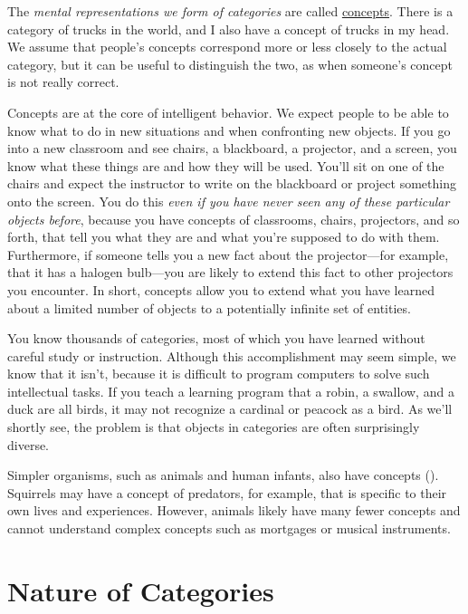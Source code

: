 \documentclass[
]{krantz}
\begin{document}
The \emph{mental representations we form of categories} are called \href{concept}{concepts}. There is a category of trucks in the world, and I also have a concept of trucks in my head. We assume that people's concepts correspond more or less closely to the actual category, but it can be useful to distinguish the two, as when someone's concept is not really correct.

Concepts are at the core of intelligent behavior. We expect people to be able to know what to do in new situations and when confronting new objects. If you go into a new classroom and see chairs, a blackboard, a projector, and a screen, you know what these things are and how they will be used. You'll sit on one of the chairs and expect the instructor to write on the blackboard or project something onto the screen. You do this \emph{even if you have never seen any of these particular objects before}, because you have concepts of classrooms, chairs, projectors, and so forth, that tell you what they are and what you're supposed to do with them. Furthermore, if someone tells you a new fact about the projector---for example, that it has a halogen bulb---you are likely to extend this fact to other projectors you encounter. In short, concepts allow you to extend what you have learned about a limited number of objects to a potentially infinite set of entities.

You know thousands of categories, most of which you have learned without careful study or instruction. Although this accomplishment may seem simple, we know that it isn't, because it is difficult to program computers to solve such intellectual tasks. If you teach a learning program that a robin, a swallow, and a duck are all birds, it may not recognize a cardinal or peacock as a bird. As we'll shortly see, the problem is that objects in categories are often surprisingly diverse.

Simpler organisms, such as animals and human infants, also have concepts (). Squirrels may have a concept of predators, for example, that is specific to their own lives and experiences. However, animals likely have many fewer concepts and cannot understand complex concepts such as mortgages or musical instruments.

\section{Nature of Categories}\label{nature-of-categories}
\end{document}
